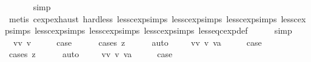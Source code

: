 \begin{isabellebody}
\ \ \ \ \ \isamarkupfalse%
\ simp\isanewline
\ \ \ \ \ \isamarkupfalse%
\ {\isacharparenleft}metis\ cexp{\isachardot}exhaust\ hard{\isacharunderscore}less\ less{\isacharunderscore}cexp{\isachardot}simps{\isacharparenleft}{}{}{\isacharparenright}\ less{\isacharunderscore}cexp{\isachardot}simps{\isacharparenleft}{}{}{\isacharparenright}\ less{\isacharunderscore}cexp{\isachardot}simps{\isacharparenleft}{}{}{\isacharparenright}\ less{\isacharunderscore}cexp{\isachardot}simps{\isacharparenleft}{}{}{\isacharparenright}\ less{\isacharunderscore}cexp{\isachardot}simps{\isacharparenleft}{}{}{\isacharparenright}\ less{\isacharunderscore}cexp{\isachardot}simps{\isacharparenleft}{}{}{\isacharparenright}\ less{\isacharunderscore}cexp{\isachardot}simps{\isacharparenleft}{}{\isacharparenright}\ less{\isacharunderscore}eq{\isacharunderscore}cexp{\isacharunderscore}def{\isacharparenright}\isanewline
\ \ \ \ \isamarkupfalse%
\ simp\isanewline
{}\isamarkupfalse%
\isanewline
\ \ \isamarkupfalse%
\ {\isacharparenleft}{\isachardoublequoteopen}{}{}{\isacharunderscore}{}{\isachardoublequoteclose}\ vv\ v{\isacharparenright}\isanewline
\ \ \isamarkupfalse%
\ \isamarkupfalse%
\ {\isacharquery}case\isanewline
\ \ \ \ \isamarkupfalse%
\ {\isacharparenleft}cases\ z{\isacharparenright}\isanewline
\ \ \ \ \isamarkupfalse%
\ auto\isanewline
{}\isamarkupfalse%
\isanewline
\ \ \isamarkupfalse%
\ {\isacharparenleft}{\isachardoublequoteopen}{}{}{\isacharunderscore}{}{\isachardoublequoteclose}\ vv\ v\ va{\isacharparenright}\isanewline
\ \ \isamarkupfalse%
\ \isamarkupfalse%
\ {\isacharquery}case\isanewline
\ \ \ \ \isamarkupfalse%
\ {\isacharparenleft}cases\ z{\isacharparenright}\isanewline
\ \ \ \ \isamarkupfalse%
\ auto\isanewline
{}\isamarkupfalse%
\isanewline
\ \ \isamarkupfalse%
\ {\isacharparenleft}{\isachardoublequoteopen}{}{}{\isacharunderscore}{}{\isachardoublequoteclose}\ vv\ v\ va{\isacharparenright}\isanewline
\ \ \isamarkupfalse%
\ \isamarkupfalse%
\ {\isacharquery}case\isanewline
\ \ \ \ \isamarkupfalse%

\end{isabellebody}
